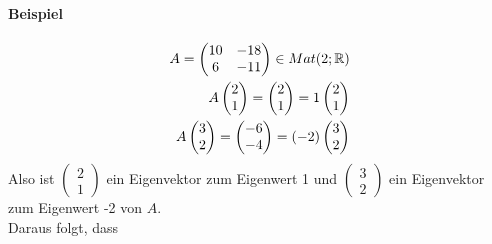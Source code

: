 \paragraph{Beispiel}
\begin{align}
A = \begin{pmatrix} 10 & -18 \\ 6 & -11 \end{pmatrix} \in Mat(2; \mathbb{R}) \\
A \begin{pmatrix} 2 \\ 1\end{pmatrix} = \begin{pmatrix} 2 \\ 1\end{pmatrix} = 1 \begin{pmatrix} 2 \\ 1\end{pmatrix} \\
A \begin{pmatrix} 3 \\ 2 \end{pmatrix} = \begin{pmatrix} -6 \\ -4 \end{pmatrix} = (-2) \begin{pmatrix} 3 \\ 2 \end{pmatrix}
\end{align}
Also ist $\begin{pmatrix} 2 \\ 1 \end{pmatrix}$ ein Eigenvektor zum Eigenwert 1 und $\begin{pmatrix} 3 \\ 2 \end{pmatrix}$ ein Eigenvektor zum Eigenwert -2 von $A$.\\
Daraus folgt, dass
